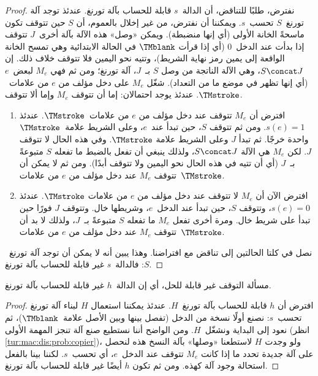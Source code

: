 \documentclass[../../../include/open-logic-section]{subfiles}
\begin{document}
\begin{proof}
نفترض، طلبًا للتناقض، أن الدالة~$s$ قابلة للحساب بآلة تورنغ. عندئذ
توجد آلة تورنغ~$S$ تحسب~$s$. ويمكننا أن نفترض، من غير إخلال بالعموم،
أن $S$ حين تتوقف تكون ماسحةً الخانة الأولى (أي إنها منضبطة). ويمكن
«وصل» هذه الآلة بآلة أخرى~$J$ تتوقف إذا بدأت عند الدخل~$0$ (أي إذا
قرأت $\TMblank$ في الحالة الابتدائية وهي تمسح الخانة الواقعة إلى يمين
رمز نهاية الشريط)، وتتيه نحو اليمين فلا تتوقف خلاف ذلك. إن
$S\concat J$، وهي الآلة الناتجة من وصل $S$ بـ~$J$، آلة تورنغ؛ ومن ثم
فهي $M_e$ لبعض~$e$ (أي إنها تظهر في موضع ما من التعداد). شغّل $M_e$
على دخل مؤلف من $e$ من علامات~$\TMstroke$. عندئذ يوجد احتمالان: إما
أن تتوقف $M_e$ وإما ألا تتوقف.
\begin{enumerate}
\item افترض أن $M_e$ تتوقف عند دخل مؤلف من $e$ من علامات~$\TMstroke$.
  عندئذ $s(e)=1$. ومن ثم تتوقف $S$، حين تبدأ عند~$e$، وعلى الشريط
  علامة~$\TMstroke$ واحدة خرجًا. ثم تبدأ $J$ وعلى الشريط علامة
  $\TMstroke$. وفي هذه الحال لا تتوقف $J$. لكن $M_e$ هي الآلة
  $S\concat J$، ولذلك ينبغي أن تفعل بالضبط ما تفعله $S$ متبوعةً بـ~$J$
  (أي أن تتيه في هذه الحال نحو اليمين ولا تتوقف أبدًا). ومن ثم لا يمكن
  أن تتوقف $M_e$ عند دخل مؤلف من $e$ من علامات~$\TMstroke$.

\item افترض الآن أن $M_e$ لا تتوقف عند دخل مؤلف من $e$ من علامات
  $\TMstroke$. عندئذ $s(e)=0$، وتتوقف $S$، حين تبدأ عند الدخل~$e$،
  وشريطها خال. وتتوقف $J$ فورًا حين تبدأ على شريط خال. ومرة أخرى تفعل
  $M_e$ ما تفعله $S$ متبوعةً بـ~$J$، ولذلك لا بد أن تتوقف $M_e$ عند
  دخل مؤلف من $e$ من علامات~$\TMstroke$.
\end{enumerate}
نصل في كلتا الحالتين إلى تناقض مع افتراضنا. وهذا يبين أنه لا يمكن أن
توجد آلة تورنغ~$S$: فالدالة~$s$ غير قابلة للحساب بآلة تورنغ.
\end{proof}

\begin{thm}
 مسألة التوقف غير قابلة للحل، أي إن
الدالة~$h$ غير قابلة للحساب بآلة تورنغ.
\end{thm}

\begin{proof}
افترض أن $h$ قابلة للحساب بآلة تورنغ~$H$. عندئذ يمكننا استعمال $H$
لبناء آلة تورنغ تحسب~$s$: نصنع أولًا نسخة من الدخل (تفصل بينها وبين
الأصل علامة~$\TMblank$)، ثم نعود إلى البداية ونشغّل~$H$. ومن الواضح
أننا نستطيع صنع آلة تنجز المهمة الأولى (انظر
\cref{tur:mac:dis:prob:copier})، ولو وجدت $H$ لاستطعنا «وصلها» بآلة
النسخ هذه لنحصل على آلة جديدة تحدد ما إذا كانت $M_e$ تتوقف عند
الدخل~$e$، أي تحسب~$s$. لكننا بينا بالفعل استحالة وجود آلة كهذه. ومن
ثم تكون $h$ أيضًا غير قابلة للحساب بآلة تورنغ.
\end{proof}
\end{document}
